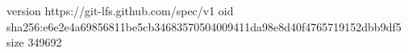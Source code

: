 version https://git-lfs.github.com/spec/v1
oid sha256:e6e2e4a69856811be5cb34683570504009411da98e8d40f4765719152dbb9df5
size 349692
